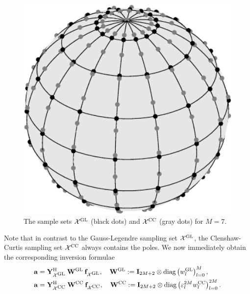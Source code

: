 \begin{figure}[tb]
  \centering
  \includegraphics[width=12cm]{images/quadrature}
  \caption{The sample sets $\mathcal{X}^{\mbox{\scriptsize\rm{GL}}}$ (black dots) and $\mathcal{X}^{\mbox{\scriptsize\rm{CC}}}$ (gray dots) for $M=7$.}
  \label{quadrature}
\end{figure}
Note that in contrast to the Gauss-Legendre sampling set $\mathcal{X}^{\mbox{\scriptsize\rm{GL}}}$,
the Clenshaw-Curtis sampling set $\mathcal{X}^{\mbox{\scriptsize\rm{CC}}}$ always contains the poles.
We now immediately obtain the corresponding inversion formulae
\begin{equation}
  \label{NFSFT:InversionFormula}
  \begin{split}
    \mathbf{a} & = \mathbf{Y}_{\mathcal{X}^{\mbox{\scriptsize\rm{GL}}}}^{\text{\rm{H}}} \: \mathbf{W}^{\mbox{\scriptsize\rm{GL}}} \:
    \mathbf{f}_{\mathcal{X}^{\mbox{\scriptsize\rm{GL}}}},\quad \mathbf{W}^{\mbox{\scriptsize\rm{GL}}} := \mathbf{I}_{2M+2} 
    \otimes \text{\rm{diag}}\left(w_{l}^{\mbox{\scriptsize\rm{GL}}}\right)_{l=0}^M,\\
    \mathbf{a} & = \mathbf{Y}_{\mathcal{X}^{\mbox{\scriptsize\rm{CC}}}}^{\text{\rm{H}}} \: \mathbf{W}^{\mbox{\scriptsize\rm{CC}}} \:
    \mathbf{f}_{\mathcal{X}^{\mbox{\scriptsize\rm{CC}}}},\quad \mathbf{W}^{\mbox{\scriptsize\rm{CC}}} := \mathbf{I}_{2M+2} 
    \otimes \text{\rm{diag}}\left(\varepsilon_{l}^{2M}w_{l}^{\mbox{\scriptsize\rm{CC}}}\right)_{l=0}^{2M}.
  \end{split}  
\end{equation}  
